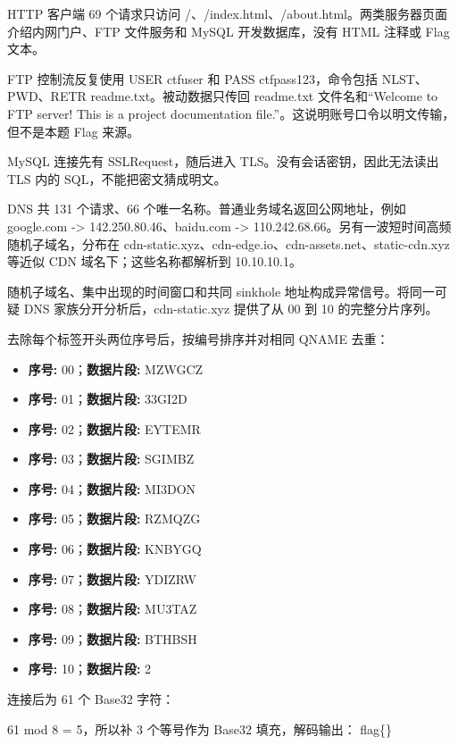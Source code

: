 HTTP 客户端 69 个请求只访问 /、/index.html、/about.html。两类服务器页面介绍内网门户、FTP 文件服务和 MySQL 开发数据库，没有 HTML 注释或 Flag 文本。

FTP 控制流反复使用 USER ctfuser 和 PASS ctfpass123，命令包括 NLST、PWD、RETR readme.txt。被动数据只传回 readme.txt 文件名和``Welcome to FTP server! This is a project documentation file.''。这说明账号口令以明文传输，但不是本题 Flag 来源。

MySQL 连接先有 SSLRequest，随后进入 TLS。没有会话密钥，因此无法读出 TLS 内的 SQL，不能把密文猜成明文。

DNS 共 131 个请求、66 个唯一名称。普通业务域名返回公网地址，例如 google.com -\textgreater{} 142.250.80.46、baidu.com -\textgreater{} 110.242.68.66。另有一波短时间高频随机子域名，分布在 cdn-static.xyz、cdn-edge.io、cdn-assets.net、static-cdn.xyz 等近似 CDN 域名下；这些名称都解析到 10.10.10.1。

随机子域名、集中出现的时间窗口和共同 sinkhole 地址构成异常信号。将同一可疑 DNS 家族分开分析后，cdn-static.xyz 提供了从 00 到 10 的完整分片序列。

去除每个标签开头两位序号后，按编号排序并对相同 QNAME 去重：

\begin{itemize}
\tightlist
\item
  \textbf{序号:} 00；\textbf{数据片段:} MZWGCZ
\item
  \textbf{序号:} 01；\textbf{数据片段:} 33GI2D
\item
  \textbf{序号:} 02；\textbf{数据片段:} EYTEMR
\item
  \textbf{序号:} 03；\textbf{数据片段:} SGIMBZ
\item
  \textbf{序号:} 04；\textbf{数据片段:} MI3DON
\item
  \textbf{序号:} 05；\textbf{数据片段:} RZMQZG
\item
  \textbf{序号:} 06；\textbf{数据片段:} KNBYGQ
\item
  \textbf{序号:} 07；\textbf{数据片段:} YDIZRW
\item
  \textbf{序号:} 08；\textbf{数据片段:} MU3TAZ
\item
  \textbf{序号:} 09；\textbf{数据片段:} BTHBSH
\item
  \textbf{序号:} 10；\textbf{数据片段:} 2
\end{itemize}

连接后为 61 个 Base32 字符： 

61 mod 8 = 5，所以补 3 个等号作为 Base32 填充，解码输出： flag\{\}

